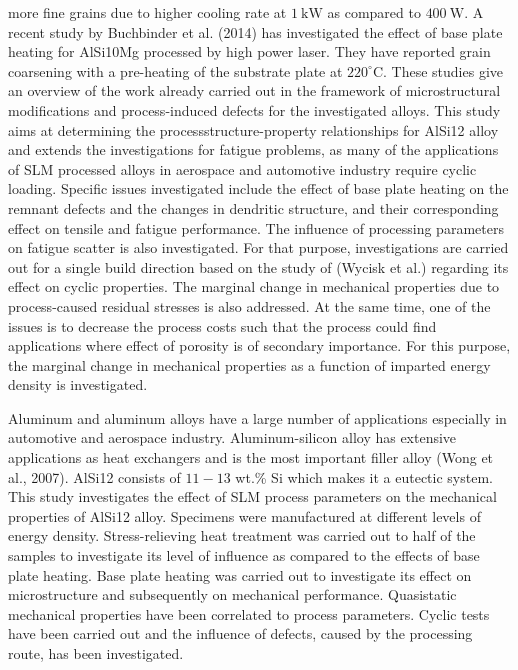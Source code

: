 \documentclass[10pt]{article}
\begin{document}
more fine grains due to higher cooling rate at $1 \mathrm{~kW}$ as compared to $400 \mathrm{~W}$. A recent study by Buchbinder et al. (2014) has investigated the effect of base plate heating for AlSi10Mg processed by high power laser. They have reported grain coarsening with a pre-heating of the substrate plate at $220^{\circ} \mathrm{C}$. These studies give an overview of the work already carried out in the framework of microstructural modifications and process-induced defects for the investigated alloys. This study aims at determining the processstructure-property relationships for AlSi12 alloy and extends the investigations for fatigue problems, as many of the applications of SLM processed alloys in aerospace and automotive industry require cyclic loading. Specific issues investigated include the effect of base plate heating on the remnant defects and the changes in dendritic structure, and their corresponding effect on tensile and fatigue performance. The influence of processing parameters on fatigue scatter is also investigated. For that purpose, investigations are carried out for a single build direction based on the study of (Wycisk et al.) regarding its effect on cyclic properties. The marginal change in mechanical properties due to process-caused residual stresses is also addressed. At the same time, one of the issues is to decrease the process costs such that the process could find applications where effect of porosity is of secondary importance. For this purpose, the marginal change in mechanical properties as a function of imparted energy density is investigated.

Aluminum and aluminum alloys have a large number of applications especially in automotive and aerospace industry. Aluminum-silicon alloy has extensive applications as heat exchangers and is the most important filler alloy (Wong et al., 2007). AlSi12 consists of $11-13$ wt.\% Si which makes it a eutectic system. This study investigates the effect of SLM process parameters on the mechanical properties of AlSi12 alloy. Specimens were manufactured at different levels of energy density. Stress-relieving heat treatment was carried out to half of the samples to investigate its level of influence as compared to the effects of base plate heating. Base plate heating was carried out to investigate its effect on microstructure and subsequently on mechanical performance. Quasistatic mechanical properties have been correlated to process parameters. Cyclic tests have been carried out and the influence of defects, caused by the processing route, has been investigated.
\end{document}
